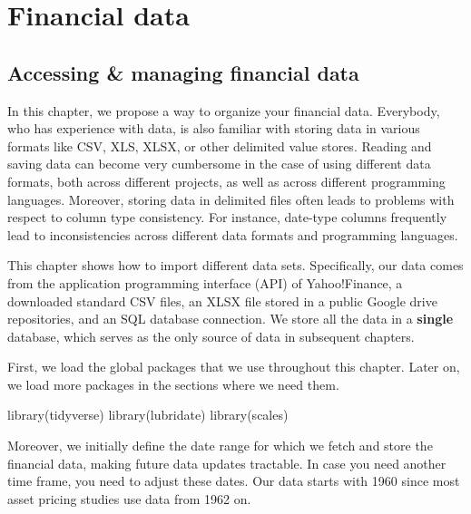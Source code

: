 \documentclass[
]{krantz}
\newenvironment{Shaded}{\begin{snugshade}}{\end{snugshade}}
\newcommand{\FunctionTok}[1]{\textcolor[rgb]{0,0,0}{#1}}
\newcommand{\NormalTok}[1]{#1}
\begin{document}
\hypertarget{part-financial-data}{%
\part*{Financial data}\label{part-financial-data}}


\hypertarget{accessing-managing-financial-data}{%
\chapter{Accessing \& managing financial data}\label{accessing-managing-financial-data}}

In this chapter, we propose a way to organize your financial data. Everybody, who has experience with data, is also familiar with storing data in various formats like CSV, XLS, XLSX, or other delimited value stores. Reading and saving data can become very cumbersome in the case of using different data formats, both across different projects, as well as across different programming languages. Moreover, storing data in delimited files often leads to problems with respect to column type consistency. For instance, date-type columns frequently lead to inconsistencies across different data formats and programming languages.

This chapter shows how to import different data sets. Specifically, our data comes from the application programming interface (API) of Yahoo!Finance, a downloaded standard CSV files, an XLSX file stored in a public Google drive repositories, and an SQL database connection. We store all the data in a \textbf{single} database, which serves as the only source of data in subsequent chapters.

First, we load the global packages that we use throughout this chapter. Later on, we load more packages in the sections where we need them.

\begin{Shaded}
\begin{Highlighting}[]
\FunctionTok{library}\NormalTok{(tidyverse)}
\FunctionTok{library}\NormalTok{(lubridate)}
\FunctionTok{library}\NormalTok{(scales)}
\end{Highlighting}
\end{Shaded}

Moreover, we initially define the date range for which we fetch and store the financial data, making future data updates tractable. In case you need another time frame, you need to adjust these dates. Our data starts with 1960 since most asset pricing studies use data from 1962 on.
\end{document}
